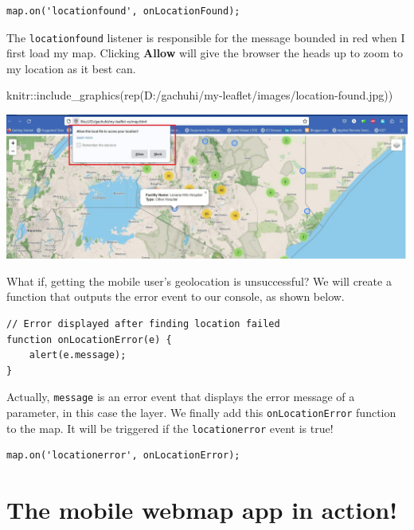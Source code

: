\documentclass[
]{book}
\newenvironment{Shaded}{\begin{snugshade}}{\end{snugshade}}
\newcommand{\FunctionTok}[1]{\textcolor[rgb]{0.00,0.00,0.00}{#1}}
\newcommand{\NormalTok}[1]{#1}
\newcommand{\SpecialCharTok}[1]{\textcolor[rgb]{0.00,0.00,0.00}{#1}}
\newcommand{\StringTok}[1]{\textcolor[rgb]{0.31,0.60,0.02}{#1}}
\begin{document}
\begin{verbatim}
map.on('locationfound', onLocationFound);
\end{verbatim}

The \texttt{locationfound} listener is responsible for the message bounded in red when I first load my map. Clicking \textbf{Allow} will give the browser the heads up to zoom to my location as it best can.

\begin{Shaded}
\begin{Highlighting}[]
\NormalTok{knitr}\SpecialCharTok{::}\FunctionTok{include\_graphics}\NormalTok{(}\FunctionTok{rep}\NormalTok{(}\StringTok{\textquotesingle{}D:/gachuhi/my{-}leaflet/images/location{-}found.jpg\textquotesingle{}}\NormalTok{))}
\end{Highlighting}
\end{Shaded}

\includegraphics[width=26.49in]{../images/location-found}

What if, getting the mobile user's geolocation is unsuccessful? We will create a function that outputs the error event to our console, as shown below.

\begin{verbatim}
// Error displayed after finding location failed
function onLocationError(e) {
    alert(e.message);
}
\end{verbatim}

Actually, \texttt{message} is an error event that displays the error message of a parameter, in this case the layer. We finally add this \texttt{onLocationError} function to the map. It will be triggered if the \texttt{\textquotesingle{}locationerror\textquotesingle{}} event is true!

\begin{verbatim}
map.on('locationerror', onLocationError);
\end{verbatim}

\hypertarget{the-mobile-webmap-app-in-action}{%
\section{The mobile webmap app in action!}\label{the-mobile-webmap-app-in-action}}
\end{document}
